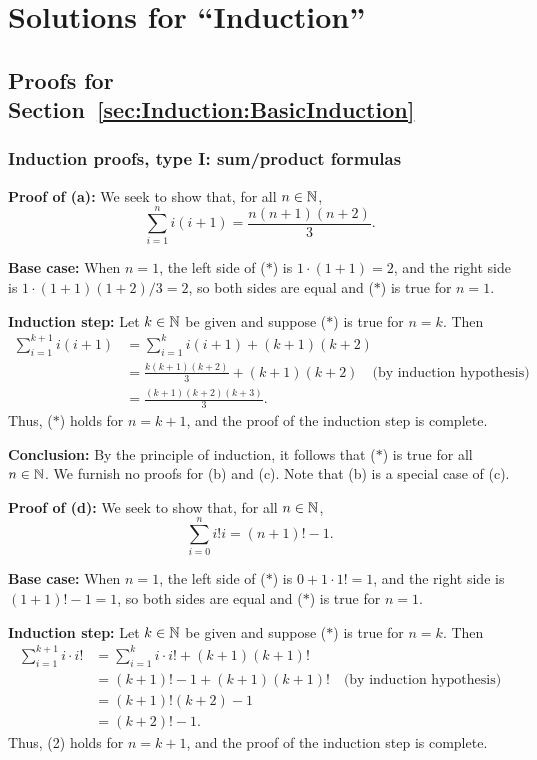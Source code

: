 \section{Solutions for ``Induction''}
\subsection{Proofs for Section~\ref{sec:Induction:BasicInduction}}
\subsubsection{Induction proofs, type I: sum/product formulas}


\textbf{Proof of (a):}
We seek to show that, for all $n\in\mathbb{N}$,  
\[
\sum_{i=1}^n i(i+1)=\frac{n(n+1)(n+2)}{3}. 
\tag{$*$}
\]

\textbf{Base case:} When $n=1$, the left side of ($*$) is $1\cdot(1+1) =2$,
and the
right side is $1\cdot(1+1)(1+2)/3=2$, so both sides are equal and ($*$) is
true for $n=1$.

\textbf{Induction step:} Let $k\in\mathbb{N}$ be given and suppose 
($*$) is true for $n=k$. Then
\begin{align*}
\sum_{i=1}^{k+1}i(i+1)
&=
\sum_{i=1}^{k}i(i+1)
+(k+1)(k+2)
\\
&=\frac{k(k+1)(k+2)}{3} 
+(k+1)(k+2)
\quad \text{(by induction hypothesis)}
\\
&=\frac{(k+1)(k+2)(k+3)}{3}.
\end{align*}
Thus, ($*$) holds for $n=k+1$, and the proof of the induction step is complete. 

\textbf{Conclusion:} By the principle of induction,  it follows that
($*$) is true for all $n\in\mathbb{N}$.  
\medskip
We furnish no proofs for (b) and (c).  Note that (b) is a special case of (c).

\medskip


\textbf{Proof of (d):}
We seek to show that, for all $n\in\mathbb{N}$,
\[
\sum_{i=0}^n i! i
= (n+1)!-1. 
\tag{$*$}
\]

\textbf{Base case:} When $n=1$, the left side of ($*$) is $0+1 \cdot 1! =1$,
and the
right side is $(1+1)!-1=1$, so both sides are equal and ($*$) is
true for $n=1$.

\textbf{Induction step:} Let $k\in\mathbb{N}$ be given and suppose 
($*$) is true for $n=k$. Then
\begin{align*}
\sum_{i=1}^{k+1}i\cdot i!
&=
\sum_{i=1}^{k}i\cdot i! + (k+1)(k+1)!
\\
&= (k+1)!-1 + (k+1)(k+1)!
\quad \text{(by induction hypothesis)}
\\
&=(k+1)!(k+2)-1
\\
&=(k+2)!-1.
\end{align*}
Thus, (2) holds for $n=k+1$, and the proof of the induction step is complete. 

